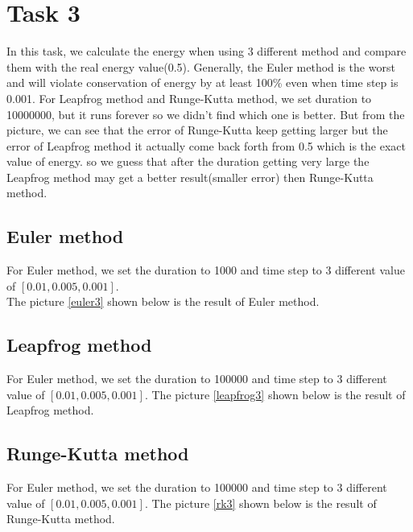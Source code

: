 \documentclass[12pt]{article}%
\begin{document}
\section{Task 3}
In this task, we calculate the energy when using 3 different method and compare them with the real energy value(0.5). Generally, the Euler method is the worst and will violate conservation of energy by at least 100\% even when time step is 0.001. For Leapfrog method and Runge-Kutta method, we set duration to 10000000, but it runs forever so we didn't find which one is better. But from the picture, we can see that the error of Runge-Kutta keep getting larger but the error of Leapfrog method it actually come back forth from 0.5 which is the exact value of energy. so we guess that after the duration getting very large the Leapfrog method may get a better result(smaller error) then Runge-Kutta method.
\subsection{Euler method}
For Euler method, we set the duration to 1000 and time step to 3 different value of \([0.01,0.005,0.001]\).\\
The picture \ref{euler3} shown below is the result of Euler method.
\subsection{Leapfrog method}
For Euler method, we set the duration to 100000 and time step to 3 different value of \([0.01,0.005,0.001]\).
The picture \ref{leapfrog3} shown below is the result of Leapfrog method.
\subsection{Runge-Kutta method}
For Euler method, we set the duration to 100000 and time step to 3 different value of \([0.01,0.005,0.001]\).
The picture \ref{rk3} shown below is the result of Runge-Kutta method.
\end{document}
